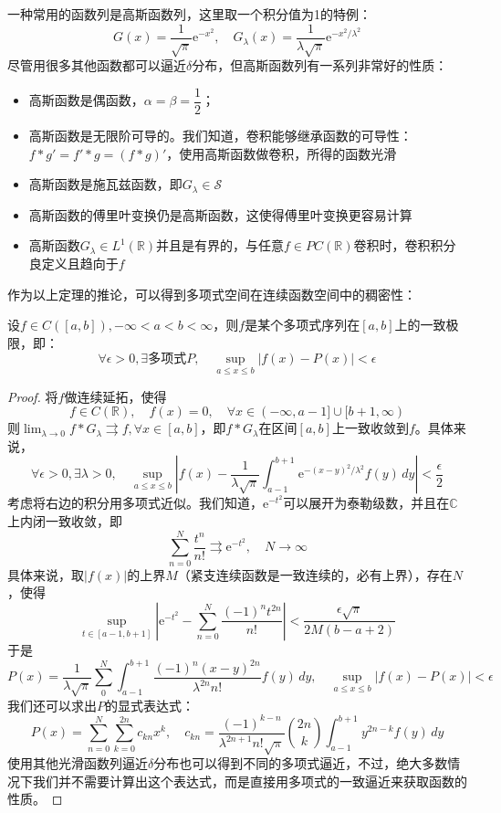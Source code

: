 一种常用的函数列是高斯函数列，这里取一个积分值为1的特例：
\[G(x)=\frac{1}{\sqrt{\pi}}\mathrm{e}^{-x^2},\quad G_\lambda(x)=\frac{1}{\lambda\sqrt{\pi}}\mathrm{e}^{-x^2/\lambda^2}\]
尽管用很多其他函数都可以逼近$\delta$分布，但高斯函数列有一系列非常好的性质：\begin{itemize}
    \item 高斯函数是偶函数，$\alpha=\beta=\dfrac{1}{2}$；
    \item 高斯函数是无限阶可导的。我们知道，卷积能够继承函数的可导性：$f*g'=f'*g=(f*g)'$，使用高斯函数做卷积，所得的函数光滑
    \item 高斯函数是施瓦兹函数，即$G_\lambda\in \mathcal{S}$
    \item 高斯函数的傅里叶变换仍是高斯函数，这使得傅里叶变换更容易计算
    \item 高斯函数$G_\lambda\in L^1(\mathbb{R})$并且是有界的，与任意$f\in PC(\mathbb{R})$卷积时，卷积积分良定义且趋向于$f$
\end{itemize}

作为以上定理的推论，可以得到多项式空间在连续函数空间中的稠密性：
\begin{theorem}[*魏尔斯特拉斯第一逼近定理]\label{thm:weierstrass_1}
    设$f\in C([a,b]),-\infty<a<b<\infty$，则$f$是某个多项式序列在$[a,b]$上的一致极限，即：
    \[\forall \epsilon>0,\exists \text{多项式}P,\quad \sup_{a\leq x\leq b}|f(x)-P(x)|<\epsilon\]
\end{theorem}
\begin{proof}
    将$f$做连续延拓，使得
    $$f\in C(\mathbb{R}),\quad f(x)=0,\quad\forall x\in (-\infty,a-1]\cup[b+1,\infty)$$
    则$\lim_{\lambda\to 0}f*G_\lambda \rightrightarrows f,\forall x\in[a,b]$，即$f*G_\lambda$在区间$[a,b]$上一致收敛到$f$。具体来说，
    \[\forall \epsilon>0,\exists \lambda>0,\quad \sup_{a\leq x\leq b}\left|f(x)-\frac{1}{\lambda\sqrt{\pi}}\int_{a-1}^{b+1}\mathrm{e}^{-(x-y)^2/\lambda^2}f(y)\,dy\right|<\frac{\epsilon}{2}\]
    考虑将右边的积分用多项式近似。我们知道，$\mathrm{e}^{-t^2}$可以展开为泰勒级数，并且在$\mathbb{C}$上内闭一致收敛，即
    \[\sum_{n=0}^{N}\frac{t^n}{n!}\rightrightarrows \mathrm{e}^{-t^2},\quad N\to\infty\]
    具体来说，取$|f(x)|$的上界$M$（紧支连续函数是一致连续的，必有上界），存在$N$，使得
    \[\sup_{t\in[a-1,b+1]}\left|\mathrm{e}^{-t^2}-\sum_{n=0}^{N}\frac{(-1)^n t^{2n}}{n!}\right|<\frac{\epsilon\sqrt{\pi}}{2M(b-a+2)}\]
    于是
    \[P(x)=\frac{1}{\lambda\sqrt{\pi}}\sum_{0}^{N}\int_{a-1}^{b+1}\frac{(-1)^n (x-y)^{2n}}{\lambda^{2n}n!}f(y)\,dy,\quad \sup_{a\leq x\leq b}\left|f(x)-P(x)\right|<\epsilon\]
    我们还可以求出$P$的显式表达式：
    \[P(x)=\sum_{n=0}^{N}\sum_{k=0}^{2n}c_{kn}x^k,\quad c_{kn}=\frac{(-1)^{k-n}}{\lambda^{2n+1}n!\sqrt{\pi}}\binom{2n}{k}\int_{a-1}^{b+1}y^{2n-k}f(y)\,dy\]
    使用其他光滑函数列逼近$\delta$分布也可以得到不同的多项式逼近，不过，绝大多数情况下我们并不需要计算出这个表达式，而是直接用多项式的一致逼近来获取函数的性质。
\end{proof}

